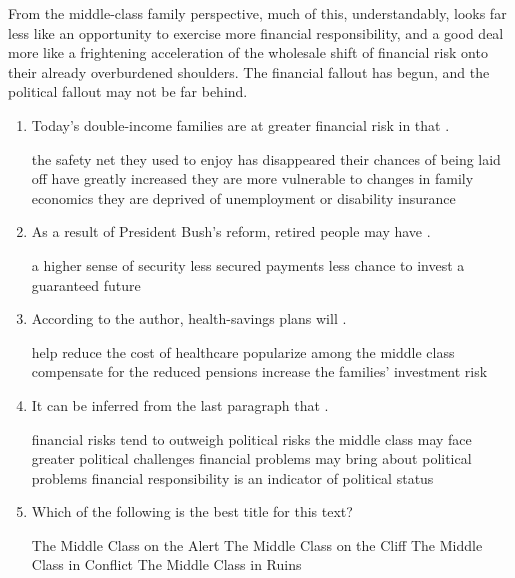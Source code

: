 From the middle-class family perspective, much of this, understandably,
looks far less like an opportunity to exercise more financial
responsibility, and a good deal more like a frightening acceleration of
the wholesale shift of financial risk onto their already overburdened
shoulders. The financial fallout has begun, and the political fallout
may not be far behind.

\begin{enumerate}[resume]
	\item
Today's double-income families are at greater financial risk
in that \lineread.


\fourchoices
{the safety net they used to enjoy has disappeared}
{their chances of being laid off have greatly increased}
{they are more vulnerable to changes in family economics}
{they are deprived of unemployment or disability insurance}



\item
As a result of President Bush's reform, retired people may
have \lineread.


\fourchoices
{a higher sense of security}
{less secured payments}
{less chance to invest}
{a guaranteed future}




\item
According to the author, health-savings plans will \lineread.


\fourchoices
{help reduce the cost of healthcare}
{popularize among the middle class}
{compensate for the reduced pensions}
{increase the families' investment risk}



\item
 It can be inferred from the last paragraph that \lineread.


\fourchoices
{financial risks tend to outweigh political risks}
{the middle class may face greater political challenges}
{financial problems may bring about political problems}
{financial responsibility is an indicator of political status}


\item
Which of the following is the best title for this text?


\fourchoices
{The Middle Class on the Alert}
{The Middle Class on the Cliff}
{The Middle Class in Conflict}
{The Middle Class in Ruins}


\end{enumerate}


